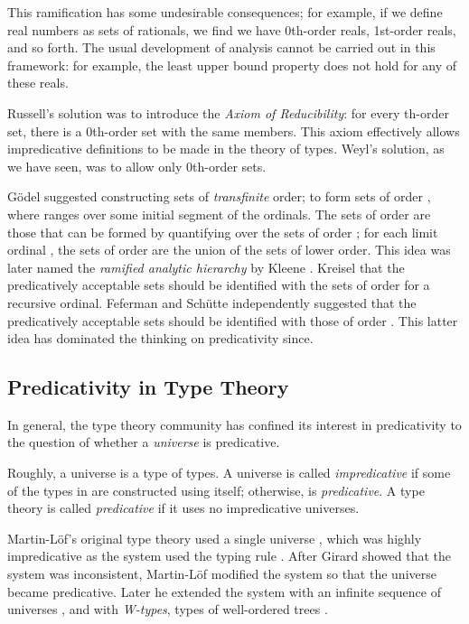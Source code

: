 \documentclass[acmtocl]{acmtrans2m}
\begin{document}
This ramification has some undesirable consequences; for example, if we define real numbers as sets of rationals, we find we have 0th-order reals, 1st-order reals, and so forth.  The usual development of analysis cannot be carried out in this framework: for example, the least upper bound property does not hold for any of these reals.

Russell's solution was to introduce the \emph{Axiom of Reducibility}: for every th-order set, there is a 0th-order set with the same members.  This axiom effectively allows impredicative definitions to be made in the theory of types.  Weyl's solution, as we have seen, was to allow only 0th-order sets.

G\"odel  suggested constructing sets of \emph{transfinite} order; to form sets of order , where  ranges over some initial segment of the ordinals.  The sets of order  are those that can be formed by quantifying over the sets of order ; for each limit ordinal , the sets of order  are the union of the sets of lower order.  This idea was later named the \emph{ramified analytic hierarchy} by Kleene .  Kreisel  that the predicatively acceptable sets should be identified with the sets of order  for  a recursive ordinal.  Feferman  and Sch\"utte  independently suggested that the predicatively acceptable sets should be identified with those of order .  This latter idea has dominated the thinking on predicativity since.


\pagebreak

\subsection{Predicativity in Type Theory}

In general, the type theory community has confined its interest in predicativity to the question of whether a \emph{universe} is predicative.

Roughly, a universe is a type of types.  A universe  is called \emph{impredicative} if some of the types in  are constructed using  itself; otherwise,  is \emph{predicative}.  A type theory is called \emph{predicative} if it uses no impredicative universes.

Martin-L\"of's original type theory \cite{ML:71} used a single
universe , which was highly impredicative as the system used the
typing rule .  After Girard 
showed that the system was inconsistent, Martin-L\"of 
modified the system so that the universe became predicative. Later
he extended the system with an infinite sequence of universes
, and with \emph{W-types}, types of well-ordered
trees  \cite{ml:cmcp}.
\end{document}
